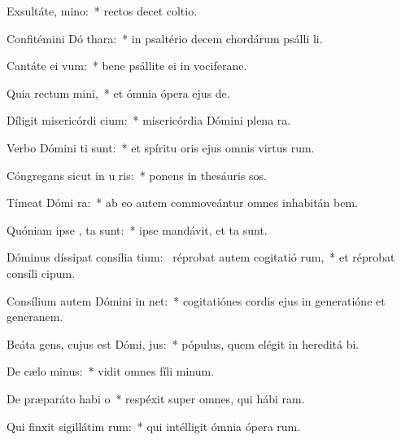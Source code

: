 \item Exsultáte,   mino:~* rectos decet coltio.
\item Confitémini Dó  thara:~* in psaltério decem chordárum psálli li.
\item Cantáte ei  vum:~* bene psállite ei in vociferane.
\item Quia rectum   mini,~* et ómnia ópera ejus  de.
\item Díligit misericórdi  cium:~* misericórdia Dómini plena  ra.
\item Verbo Dómini  ti sunt:~* et spíritu oris ejus omnis virtus rum.
\item Cóngregans sicut in u  ris:~* ponens in thesáuris sos.
\item Tímeat Dómi  ra:~* ab eo autem commoveántur omnes inhabitán bem.
\item Quóniam ipse ,  ta sunt:~* ipse mandávit, et ta sunt.
\item Dóminus díssipat consília tium:~\pscross{} réprobat autem cogitatió rum,~* et réprobat consíli cipum.
\item Consílium autem Dómini in  net:~* cogitatiónes cordis ejus in generatióne et generanem.
\item Beáta gens, cujus est Dómi,  jus:~* pópulus, quem elégit in hereditá bi.
\item De cælo  minus:~* vidit omnes fíli minum.
\item De præparáto habi o~* respéxit super omnes, qui hábi ram.
\item Qui finxit sigillátim  rum:~* qui intélligit ómnia ópera rum.

